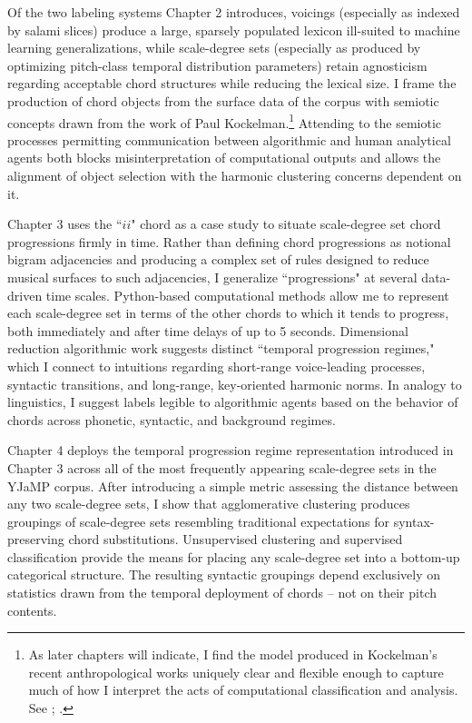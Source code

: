 Of the two labeling systems Chapter 2 introduces, voicings (especially as indexed by salami slices) produce a large, sparsely populated lexicon ill-suited to machine learning generalizations, while scale-degree sets (especially as produced by optimizing pitch-class temporal distribution parameters) retain agnosticism regarding acceptable chord structures while reducing the lexical size.  I frame the production of chord objects from the surface data of the corpus with semiotic concepts drawn from the work of Paul Kockelman.\footnote{As later chapters will indicate, I find the model produced in Kockelman's recent anthropological works uniquely clear and flexible enough to capture much of how I interpret the acts of computational classification and analysis.  See \cite{kockelman2013}; \cite{kockelman2013anthropology}.}  Attending to the semiotic processes permitting communication between algorithmic and human analytical agents both blocks misinterpretation of computational outputs and allows the alignment of object selection with the harmonic clustering concerns dependent on it.

Chapter 3 uses the ``$ii$" chord as a case study to situate scale-degree set chord progressions firmly in time.  Rather than defining chord progressions as notional bigram adjacencies and producing a complex set of rules designed to reduce musical surfaces to such adjacencies, I generalize ``progressions" at several data-driven time scales.  Python-based computational methods allow me to represent each scale-degree set in terms of the other chords to which it tends to progress, both immediately and after time delays of up to 5 seconds.  Dimensional reduction algorithmic work suggests distinct ``temporal progression regimes," which I connect to intuitions regarding short-range voice-leading processes, syntactic transitions, and long-range, key-oriented harmonic norms.  In analogy to linguistics, I suggest labels legible to algorithmic agents based on the behavior of chords across phonetic, syntactic, and background regimes.

Chapter 4 deploys the temporal progression regime representation introduced in Chapter 3 across all of the most frequently appearing scale-degree sets in the YJaMP corpus.  After introducing a simple metric assessing the distance between any two scale-degree sets, I show that agglomerative clustering produces groupings of scale-degree sets resembling traditional expectations for syntax-preserving chord substitutions.  Unsupervised clustering and supervised classification provide the means for placing any scale-degree set into a bottom-up categorical structure.  The resulting syntactic groupings depend exclusively on statistics drawn from the temporal deployment of chords -- not on their pitch contents.

